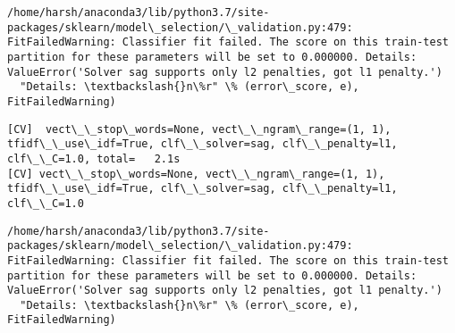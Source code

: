 \documentclass[11pt]{article}
\begin{document}
    \begin{Verbatim}[commandchars=\\\{\}]
/home/harsh/anaconda3/lib/python3.7/site-packages/sklearn/model\_selection/\_validation.py:479: FitFailedWarning: Classifier fit failed. The score on this train-test partition for these parameters will be set to 0.000000. Details: 
ValueError('Solver sag supports only l2 penalties, got l1 penalty.')
  "Details: \textbackslash{}n\%r" \% (error\_score, e), FitFailedWarning)

    \end{Verbatim}

    \begin{Verbatim}[commandchars=\\\{\}]
[CV]  vect\_\_stop\_words=None, vect\_\_ngram\_range=(1, 1), tfidf\_\_use\_idf=True, clf\_\_solver=sag, clf\_\_penalty=l1, clf\_\_C=1.0, total=   2.1s
[CV] vect\_\_stop\_words=None, vect\_\_ngram\_range=(1, 1), tfidf\_\_use\_idf=True, clf\_\_solver=sag, clf\_\_penalty=l1, clf\_\_C=1.0 

    \end{Verbatim}

    \begin{Verbatim}[commandchars=\\\{\}]
/home/harsh/anaconda3/lib/python3.7/site-packages/sklearn/model\_selection/\_validation.py:479: FitFailedWarning: Classifier fit failed. The score on this train-test partition for these parameters will be set to 0.000000. Details: 
ValueError('Solver sag supports only l2 penalties, got l1 penalty.')
  "Details: \textbackslash{}n\%r" \% (error\_score, e), FitFailedWarning)

    \end{Verbatim}
\end{document}

